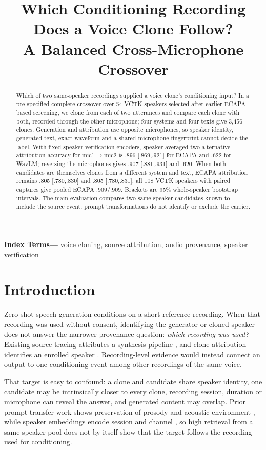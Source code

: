 \documentclass[10pt,twocolumn,letterpaper]{article}
\title{Which Conditioning Recording Does a Voice Clone Follow?\\A Balanced Cross-Microphone Crossover}
\newcommand{\ninept}{\fontsize{9}{10}\selectfont}
\newenvironment{keywords}{\par\noindent\textbf{Index Terms---}}{\par}
\begin{document}
\ninept
\maketitle

\begin{abstract}
Which of two same-speaker recordings supplied a voice clone's conditioning
input? In a pre-specified complete crossover over 54 VCTK speakers selected
after earlier ECAPA-based screening, we clone from each of two utterances and
compare each clone with both, recorded through the other microphone; four
systems and four texts give 3,456 clones. Generation and attribution use
opposite microphones, so speaker identity, generated text, exact waveform and a
shared microphone fingerprint cannot decide the label.
With fixed speaker-verification encoders, speaker-averaged two-alternative
attribution accuracy for mic1$\rightarrow$mic2 is .896 [.869,.921] for ECAPA
and .622 for WavLM; reversing the microphones gives .907 [.881,.931] and .620.
When both candidates are themselves clones from a different system and text,
ECAPA attribution remains .805 [.780,.830] and .805 [.780,.831]; all 108 VCTK
speakers with paired captures give pooled ECAPA .909/.909. Brackets are 95\%
whole-speaker bootstrap intervals. The main evaluation compares two
same-speaker candidates known to include the source event; prompt
transformations do not identify or exclude the carrier.
\end{abstract}

\begin{keywords}
voice cloning, source attribution, audio provenance, speaker verification
\end{keywords}

\section{Introduction}
Zero-shot speech generation conditions on a short reference recording. When
that recording was used without consent, identifying the generator or cloned
speaker does not answer the narrower provenance question: \emph{which recording
was used?} Existing source tracing attributes a synthesis pipeline
\cite{stopa,negroni2026forensic}, and clone attribution identifies an enrolled
speaker \cite{kato2026floor,avatar2026}. Recording-level evidence
would instead connect an output to one conditioning event among other
recordings of the same voice.

That target is easy to confound: a clone and candidate share speaker identity,
one candidate may be intrinsically closer to every clone, recording session,
duration or microphone can reveal the answer, and generated content may
overlap. Prior prompt-transfer work shows preservation of prosody and acoustic
environment \cite{restyletts2026,noiserobust2024}, while speaker
embeddings encode session and channel \cite{xvecprobe2019}, so high
retrieval from a same-speaker pool does not by itself show that the target
follows the recording used for conditioning.
\end{document}
